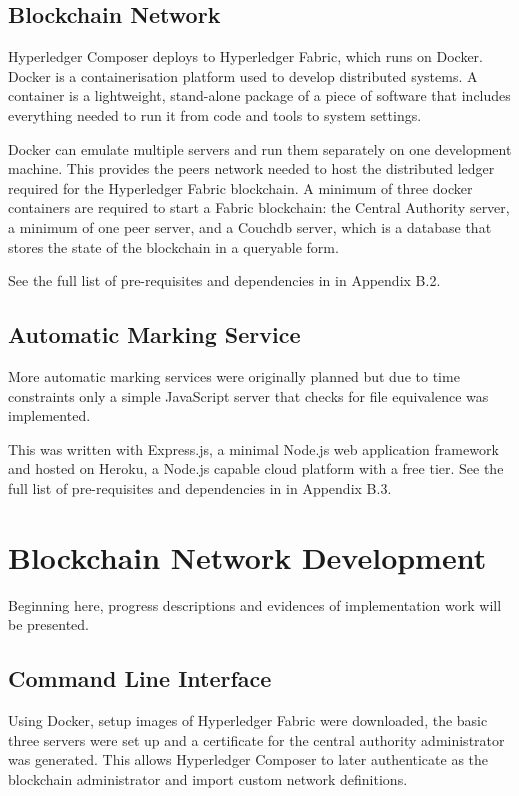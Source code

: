 \subsection{Blockchain Network}

Hyperledger Composer deploys to Hyperledger Fabric, which runs on Docker.
Docker is a containerisation platform used to develop distributed systems.
A container is a lightweight, stand-alone package of a piece of software that includes everything
needed to run it from code and tools to system settings.

Docker can emulate multiple servers and run them separately on one development machine.
This provides the peers network needed to host the distributed ledger required for the
Hyperledger Fabric blockchain. A minimum of three docker containers are required to start a
Fabric blockchain: the Central Authority server, a minimum of one peer server, and a Couchdb server,
which is a database that stores the state of the blockchain in a queryable form.

See the full list of pre-requisites and dependencies in in Appendix B.2.

\subsection{Automatic Marking Service}

More automatic marking services were originally planned but due to time constraints only
a simple JavaScript server that checks for file equivalence was implemented.

This was written with Express.js, a minimal Node.js web application framework and hosted
on Heroku, a Node.js capable cloud platform with a free tier. See the full list of pre-requisites and dependencies in in Appendix B.3.

\section{Blockchain Network Development}

Beginning here, progress descriptions and evidences of implementation work will be presented.

\subsection{Command Line Interface}
Using Docker, setup images of Hyperledger Fabric were downloaded, the basic three servers were set up
and a certificate for the central authority administrator was generated. This allows Hyperledger Composer
to later authenticate as the blockchain administrator and import custom network definitions.

